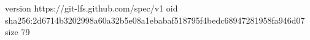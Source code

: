 version https://git-lfs.github.com/spec/v1
oid sha256:2d6714b3202998a60a32b5e08a1ebabaf518795f4bedc68947281958fa946d07
size 79
